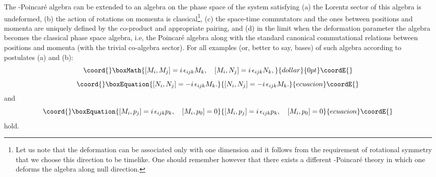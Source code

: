 \documentclass[a4paper,a4paper]{article}
\begin{document}
The \myHighlight{$\kappa$}\coordHE{}-Poincar\'e algebra can be extended to an algebra on the phase space of the system satisfying (a) the Lorentz sector of this algebra is undeformed, (b) the action of rotations  on momenta is classical\footnote{Let us note that the deformation can be associated only with one dimension and it follows from the requirement of rotational symmetry that we choose this direction to be timelike. One should remember however that there exists a different \myHighlight{$\kappa$}\coordHE{}-Poincar\'e theory in which one deforms the algebra along null direction.}, (c) the space-time commutators and the ones between positions and momenta are uniquely defined by the co-product and appropriate pairing, and (d) in the limit when the deformation parameter \myHighlight{$\kappa \rightarrow\infty$}\coordHE{} the algebra becomes the classical phase space algebra, i.e, the Poincar\'e algebra along with the standard canonical commutational relations between positions and momenta (with the trivial co-algebra sector). For all examples (or, better to say, bases) of such algebra  according to postulates (a) and (b):
$$\coord{}\boxMath{
[M_i, M_j] = i\, \epsilon_{ijk} M_k, \quad [M_i, N_j] = i\, \epsilon_{ijk} N_k,
}{dollar}{0pt}\coordE{}$$
\begin{equation}\coord{}\boxEquation{\label{1}
  [N_i, N_j] = -i\, \epsilon_{ijk} M_k.
}{[N_i, N_j] = -i\, \epsilon_{ijk} M_k.
}{ecuacion}\coordE{}\end{equation}
and
\begin{equation}\coord{}\boxEquation{\label{2}
  [M_i, p_j] = i\, \epsilon_{ijk} p_k, \quad [M_i, p_0] =0
}{[M_i, p_j] = i\, \epsilon_{ijk} p_k, \quad [M_i, p_0] =0
}{ecuacion}\coordE{}\end{equation}
hold.
\newline
\end{document}
